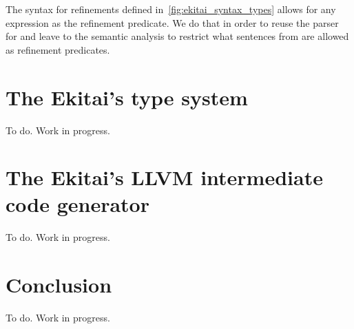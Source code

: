 \documentclass[
  oneside,
  english,
  coorientadorbanca,
  noabntexcite
]{ufsc-thesis-rn46-2019}
\newcommand{\codett}[1]{\text{\scpfamily#1}}
\newcommand{\bnfvar}[1]{\codett{#1}}
\begin{document}
The syntax for refinements defined in~\cref{fig:ekitai_syntax_types} allows for any expression as the refinement predicate.
We do that in order to reuse the parser for \bnfvar{Expr} and leave to the semantic analysis to restrict what sentences from \bnfvar{Expr} are allowed as refinement predicates.

\section{The Ekitai's type system}

To do. Work in progress.

\section{The Ekitai's LLVM intermediate code generator}

To do. Work in progress.

\section{Conclusion}

To do. Work in progress.


\postextual{}

\printbibliography{}
\end{document}

